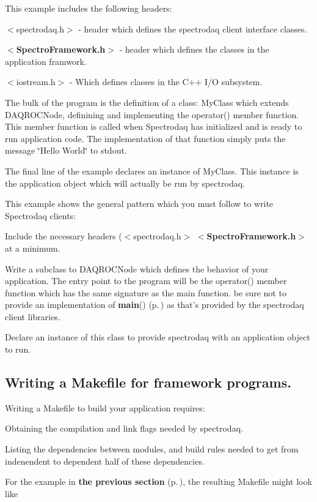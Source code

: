 This example includes the following headers:\begin{CompactItemize}
\item 
$<$spectrodaq.h$>$ - header which defines the spectrodaq client interface classes.\item 
$<${\bf Spectro\-Framework.h}$>$ - header which defines the classes in the application framwork.\item 
$<$iostream.h$>$ - Which defines classes in the C++ I/O subsystem.\end{CompactItemize}
The bulk of the program is the definition of a class: My\-Class which extends DAQROCNode, definining and implementing the operator() member function. This member function is called when Spectrodaq has initialized and is ready to run application code. The implementation of that function simply puts the message \char`\"{}Hello World\char`\"{} to stdout.

The final line of the example declares an instance of My\-Class. This instance is the application object which will actually be run by spectrodaq.

This example shows the general pattern which you must follow to write Spectrodaq clients:\begin{CompactItemize}
\item 
Include the necessary headers ($<$spectrodaq.h$>$ $<${\bf Spectro\-Framework.h}$>$ at a minimum.\item 
Write a subclass to DAQROCNode which defines the behavior of your application. The entry point to the program will be the operator() member function which has the same signature as the main function. be sure not to provide an implementation of {\bf main}() {\rm (p.\,\pageref{FdMonitorTest_8cpp_a1})} as that's provided by the spectrodaq client libraries.\item 
Declare an instance of this class to provide spectrodaq with an application object to run.\end{CompactItemize}
\subsection{Writing a Makefile for framework programs.}\label{Makefile}


Writing a Makefile to build your application requires:\begin{CompactItemize}
\item 
Obtaining the compilation and link flags needed by spectrodaq.\item 
Listing the dependencies between modules, and build rules needed to get from indenendent to dependent half of these dependencies.\end{CompactItemize}
For the example in  {\bf the previous section} {\rm (p.\,\pageref{Writing})}, the resulting Makefile might look like 

